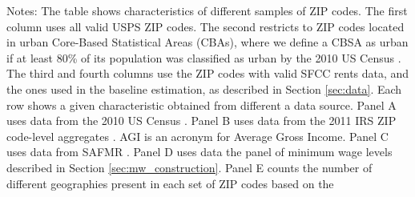 \begin{landscape}
\begin{table}[hbt!]
    \begin{minipage}{.95\linewidth} \footnotesize
        \vspace{2mm}
        Notes: The table shows characteristics of different samples of ZIP codes.
        The first column uses all valid USPS ZIP codes.
        The second restricts to ZIP codes located in urban Core-Based 
        Statistical Areas (CBAs), where we define a CBSA as urban if at least 
        80\% of its population was classified as urban by the 2010 US Census 
        \parencite{CensusDecennial}.
        The third and fourth columns use the ZIP codes with valid SFCC rents 
        data, and the ones used in the baseline estimation, as described in
        Section \ref{sec:data}.
        Each row shows a given characteristic obtained from different a data 
        source.
        Panel A uses data from the 2010 US Census \parencite{CensusDecennial}.
        Panel B uses data from the 2011 IRS ZIP code-level aggregates
        \parencite{IRS}. AGI is an acronym for Average Gross Income.
        Panel C uses data from SAFMR \parencite{hudSAFMR}.
        Panel D uses data the panel of minimum wage levels described in 
        Section \ref{sec:mw_construction}.
        Panel E counts the number of different geographies present in each set
        of ZIP codes based on the 
    \end{minipage}
\end{table}
\end{landscape}
